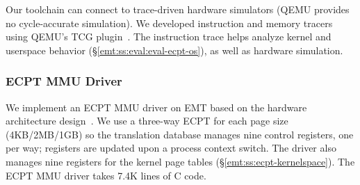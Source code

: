 Our toolchain can connect to trace-driven hardware simulators
	(QEMU provides no cycle-accurate simulation).
We developed instruction and memory tracers using QEMU's TCG plugin~\cite{plat:qemu:tcgplugin}.
The instruction trace helps analyze kernel and userspace behavior
	(\S\ref{emt:ss:eval:eval-ecpt-os}), as well as 
	hardware simulation.

\subsubsection{ECPT MMU Driver}
\label{emt:ss:ecpt-mmu-driver}

\noindent
We implement an ECPT MMU driver on EMT based on the hardware 
	architecture design~\cite{skarlatos2020ecpt}.
We use a three-way ECPT for each page size (4KB/2MB/1GB)
 	so the translation database manages nine control registers,
	one per way; registers are updated upon a process context switch.
The driver also manages nine registers
	for the kernel page tables (\S\ref{emt:ss:ecpt-kernelspace}).
The ECPT MMU driver takes 7.4K lines of C code.

